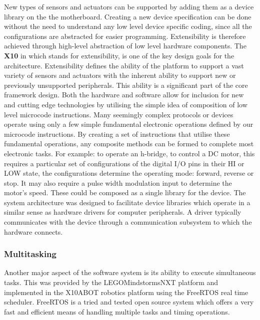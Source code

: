 	New types of sensors and actuators can be supported by adding them as a device library on the the \xten motherboard. Creating a new device specification can be done without the need to understand any low level device specific coding, since all the configurations are abstracted for easier programming. Extensibility is therefore achieved through high-level abstraction of low level hardware components.
	The \textbf{X10} in \xten which stands for extensibility, is one of the key design goals for the architecture. Extensibility defines the ability of the platform to support a vast variety of sensors and actuators with the inherent ability to support new or previously unsupported peripherals. This ability is a significant part of the core framework design. Both the hardware and software allow for inclusion for new and cutting edge technologies by utilising the simple idea of composition of low level microcode instructions. Many seemingly complex protocols or devices operate using only a few simple fundamental electronic operations defined by our microcode instructions. By creating a set of instructions that utilise these fundamental operations, any composite methods can be formed to complete most electronic tasks. For example: to operate an h-bridge, to control a DC motor, this requires a particular set of configurations of the digital I/O pins in their HI or LOW state, the configurations determine the operating mode: forward, reverse or stop. It may also require a pulse width modulation input to determine the motor's speed. These could be composed as a single library for the device. The \xten system architecture was designed to facilitate device libraries which operate in a similar sense as hardware drivers for computer peripherals. A driver typically communicates with the device through a communication subsystem to which the hardware connects.	
	
	\subsubsection{Multitasking} %
	\label{ssub:multitasking}
	
	Another major aspect of the software system is its ability to execute simultaneous tasks. This was provided by the LEGO\textregistered Mindstorms\textregistered NXT platform and implemented in the X10ABOT robotics platform using the FreeRTOS real time scheduler. FreeRTOS is a tried and tested open source system which offers a very fast and efficient means of handling multiple tasks and timing operations.
	
